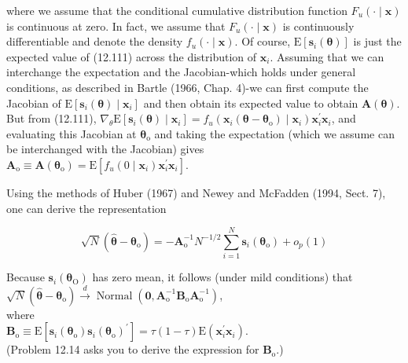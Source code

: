 \documentclass[10pt]{article}
\begin{document}
where we assume that the conditional cumulative distribution function $F_{u}(\cdot \mid \mathbf{x})$ is continuous at zero. In fact, we assume that $F_{u}(\cdot \mid \mathbf{x})$ is continuously differentiable and denote the density $f_{u}(\cdot \mid \mathbf{x})$. Of course, $\mathrm{E}\left[\mathbf{s}_{i}(\boldsymbol{\theta})\right]$ is just the expected value of (12.111) across the distribution of $\mathbf{x}_{i}$. Assuming that we can interchange the expectation and the Jacobian-which holds under general conditions, as described in Bartle (1966, Chap. 4)-we can first compute the Jacobian of $\mathrm{E}\left[\mathbf{s}_{i}(\boldsymbol{\theta}) \mid \mathbf{x}_{i}\right]$ and then obtain its expected value to obtain $\mathbf{A}(\boldsymbol{\theta})$. But from (12.111), $\nabla_{\theta} \mathrm{E}\left[\mathbf{s}_{i}(\boldsymbol{\theta}) \mid \mathbf{x}_{i}\right]= f_{u}\left(\mathbf{x}_{i}\left(\boldsymbol{\theta}-\boldsymbol{\theta}_{\mathrm{o}}\right) \mid \mathbf{x}_{i}\right) \mathbf{x}_{i}^{\prime} \mathbf{x}_{i}$, and evaluating this Jacobian at $\boldsymbol{\theta}_{\mathrm{o}}$ and taking the expectation (which we assume can be interchanged with the Jacobian) gives\\
$\mathbf{A}_{\mathrm{o}} \equiv \mathbf{A}\left(\boldsymbol{\theta}_{\mathrm{o}}\right)=\mathrm{E}\left[f_{u}\left(0 \mid \mathbf{x}_{i}\right) \mathbf{x}_{i}^{\prime} \mathbf{x}_{i}\right]$.

Using the methods of Huber (1967) and Newey and McFadden (1994, Sect. 7), one can derive the representation


\begin{equation*}
\sqrt{N}\left(\hat{\boldsymbol{\theta}}-\boldsymbol{\theta}_{\mathrm{o}}\right)=-\mathbf{A}_{\mathrm{o}}^{-1} N^{-1 / 2} \sum_{i=1}^{N} \mathbf{s}_{i}\left(\boldsymbol{\theta}_{\mathrm{o}}\right)+o_{p}(1) \tag{12.113}
\end{equation*}


Because $\mathbf{s}_{i}\left(\boldsymbol{\theta}_{\mathrm{O}}\right)$ has zero mean, it follows (under mild conditions) that\\
$\sqrt{N}\left(\hat{\boldsymbol{\theta}}-\boldsymbol{\theta}_{\mathrm{o}}\right) \xrightarrow{d} \operatorname{Normal}\left(\mathbf{0}, \mathbf{A}_{\mathrm{o}}^{-1} \mathbf{B}_{\mathrm{o}} \mathbf{A}_{\mathrm{o}}^{-1}\right)$,\\
where\\
$\mathbf{B}_{\mathrm{o}} \equiv \mathrm{E}\left[\mathbf{s}_{i}\left(\boldsymbol{\theta}_{\mathrm{o}}\right) \mathbf{s}_{i}\left(\boldsymbol{\theta}_{\mathrm{o}}\right)^{\prime}\right]=\tau(1-\tau) \mathrm{E}\left(\mathbf{x}_{i}^{\prime} \mathbf{x}_{i}\right)$.\\
(Problem 12.14 asks you to derive the expression for $\mathbf{B}_{\mathrm{o}}$.)
\end{document}
